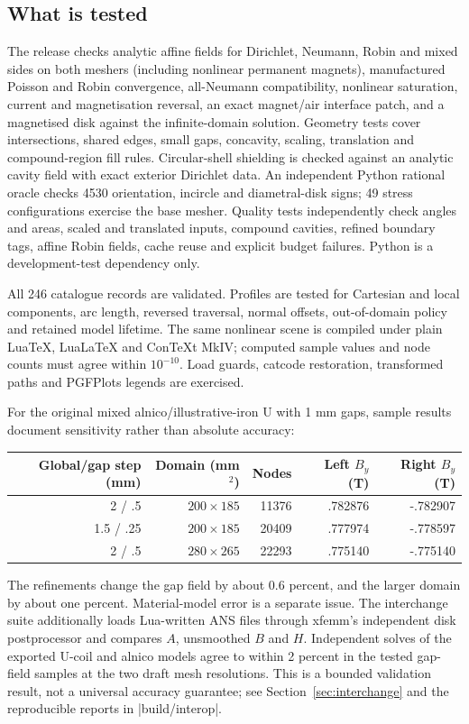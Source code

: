 \subsection{What is tested}
The release checks analytic affine fields for Dirichlet, Neumann, Robin
and mixed sides on both meshers (including nonlinear permanent magnets),
manufactured Poisson and Robin convergence, all-Neumann compatibility,
nonlinear saturation, current and magnetisation reversal, an exact
magnet/air interface patch, and a magnetised disk against the infinite-domain
solution. Geometry tests cover intersections, shared edges, small gaps,
concavity, scaling, translation and compound-region fill rules. Circular-shell
shielding is checked against an analytic cavity field with exact exterior
Dirichlet data. An independent Python rational oracle
checks 4530 orientation, incircle and diametral-disk signs; 49 stress
configurations exercise the base mesher. Quality tests independently check
angles and areas, scaled and translated inputs, compound cavities, refined
boundary tags, affine Robin fields, cache reuse and explicit budget failures.
Python is a development-test dependency only.

All 246 catalogue records are validated. Profiles are tested for Cartesian
and local components, arc length, reversed traversal, normal offsets,
out-of-domain policy and retained model lifetime. The same nonlinear
scene is compiled under plain LuaTeX, LuaLaTeX and ConTeXt MkIV; computed
sample values and node counts must agree within $10^{-10}$. Load guards,
catcode restoration, transformed paths and PGFPlots legends are exercised.

For the original mixed alnico/illustrative-iron U with 1 mm gaps, sample
results document sensitivity rather than absolute accuracy:
\begin{center}\small
\begin{tabular}{rrrrr}
\toprule Global/gap step (mm) & Domain (mm$^2$) & Nodes & Left $B_y$ (T) & Right $B_y$ (T)\\
\midrule
2 / .5 & $200\times185$ & 11376 & .782876 & -.782907\\
1.5 / .25 & $200\times185$ & 20409 & .777974 & -.778597\\
2 / .5 & $280\times265$ & 22293 & .775140 & -.775140\\
\bottomrule
\end{tabular}\end{center}
The refinements change the gap field by about 0.6 percent, and the larger
domain by about one percent. Material-model error is a separate issue.
The interchange suite additionally loads Lua-written ANS files through xfemm's
independent disk postprocessor and compares $A$, unsmoothed $B$ and $H$.
Independent solves of the exported U-coil and alnico models agree to within
2 percent in the tested gap-field samples at the two draft mesh resolutions.
This is a bounded validation result, not a universal accuracy guarantee;
see Section~\ref{sec:interchange} and the reproducible reports in |build/interop|.

